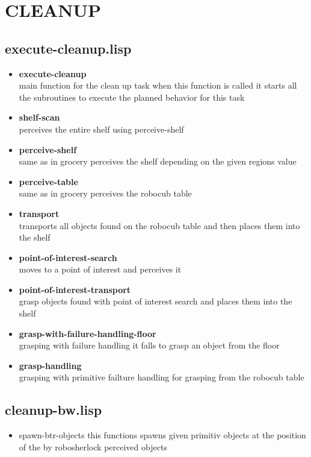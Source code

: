 \documentclass[main.tex]{subfiles}
\begin{document}
	  	\section{CLEANUP}
	  	\subsection{execute-cleanup.lisp}
	  	\begin{itemize}
			\item \textbf{execute-cleanup} \\
			main function for the clean up task when this function is called it starts all the subroutines to execute the planned behavior for this task
			\item \textbf{shelf-scan} \\
			perceives the entire shelf using perceive-shelf
			\item \textbf{perceive-shelf} \\
			same as in grocery perceives the shelf depending on the given regions value
			\item \textbf{perceive-table} \\
			same as in grocery perceives the robocub table
			\item \textbf{transport} \\
            transports all objects found on the robocub table and then places them into the shelf
			\item \textbf{point-of-interest-search} \\
			moves to a point of interest and perceives it 
			\item \textbf{point-of-interest-transport} \\
			grasp objects found with point of interest search and places them into the shelf
			\item \textbf{grasp-with-failure-handling-floor} \\
			grasping with failure handling it falls to grasp an object from the floor
			\item \textbf{grasp-handling}\\
			grasping with primitive failture handling for grasping from the robocub table
		\end{itemize}

	    \subsection{cleanup-bw.lisp}
		\begin{itemize}
			\item spawn-btr-objects
			this functions spawns given primitiv objects at the position of the by robosherlock perceived objects 
		\end{itemize}
	  	
\end{document}
